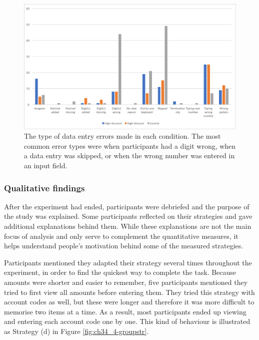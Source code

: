 
\begin{figure}
\includegraphics[width=\textwidth]{images/ch34/ch34-4_TypeofErrors.pdf}
    \caption[Study 4 type of data entry errors]{The type of data entry errors made in each condition. The most common error types were when participants had a digit wrong, when a data entry was skipped, or when the wrong number was entered in an input field.}\label{fig:ch34_4-typeoferrors}
\end{figure}

\subsubsection{Qualitative findings}
After the experiment had ended, participants were debriefed and the purpose of the study was explained. Some participants reflected on their strategies and gave additional explanations behind them. While these explanations are not the main focus of analysis and only serve to complement the quantitative measures, it helps understand people's motivation behind some of the measured strategies.

Participants mentioned they adapted their strategy several times throughout the experiment, in order to find the quickest way to complete the task. Because amounts were shorter and easier to remember, five participants mentioned they tried to first view all amounts before entering them. They tried this strategy with account codes as well, but these were longer and therefore it was more difficult to memorise two items at a time. As a result, most participants ended up viewing and entering each account code one by one. This kind of behaviour is illustrated as Strategy (d) in Figure \ref{fig:ch34_4-groupstr}.

